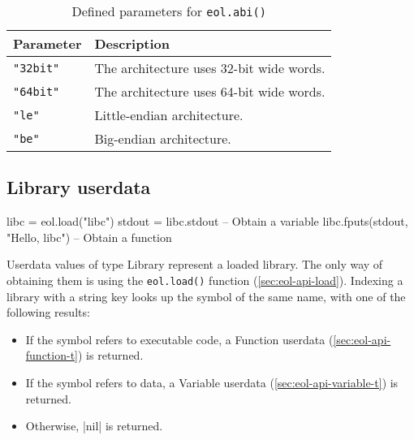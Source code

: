 \begin{table}[htH]
	\centering
	\begin{tabular}{ll}
		\toprule
		Parameter & Description \\
		\midrule
		\texttt{"32bit"} & The architecture uses 32-bit wide words. \\
		\texttt{"64bit"} & The architecture uses 64-bit wide words. \\
		\midrule
		\texttt{"le"} & Little-endian architecture. \\
		\texttt{"be"} & Big-endian architecture. \\
		\bottomrule
	\end{tabular}
	\caption{Defined parameters for \texttt{eol.abi()}}
	\label{tab:eol-abi-params}
\end{table}


%
%
%
%


\subsection{Library userdata}
	\label{sec:eol-api-library-t}

\begin{luacode}
libc = eol.load("libc")
stdout = libc.stdout  -- Obtain a variable
libc.fputs(stdout, "Hello, libc\n")  -- Obtain a function
\end{luacode}

Userdata values of type \textsf{Library} represent a loaded library. The only
way of obtaining them is using the \texttt{eol.load()} function
(\autoref{sec:eol-api-load}). Indexing a library with a string key looks up
the symbol of the same name, with one of the following results:

\begin{itemize}

	\item If the symbol refers to executable code, a \textsf{Function} userdata
	(\autoref{sec:eol-api-function-t}) is returned.

	\item If the symbol refers to data, a \textsf{Variable} userdata
	(\autoref{sec:eol-api-variable-t}) is returned.

	\item Otherwise, \Mlua|nil| is returned.

\end{itemize}

